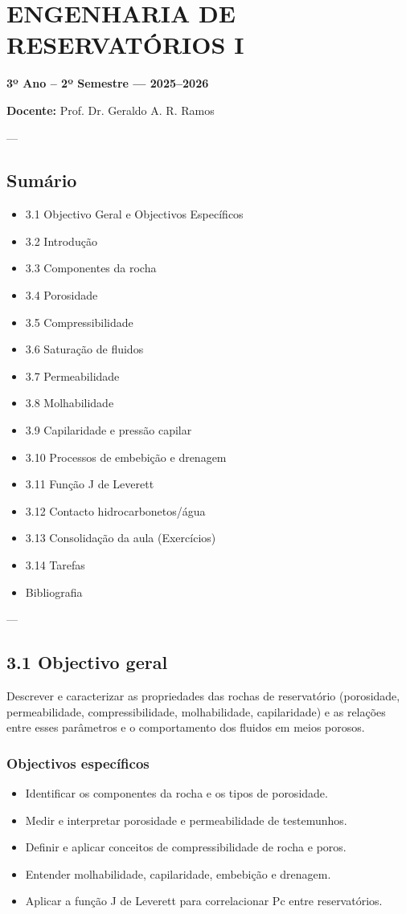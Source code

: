 \documentclass[11pt,a4paper]{article}
\begin{document}
\section{ENGENHARIA DE RESERVATÓRIOS I}
\textbf{3º Ano – 2º Semestre — 2025–2026}

\textbf{Docente:} Prof. Dr. Geraldo A. R. Ramos

---

\subsection{Sumário}
\begin{itemize}
\item 3.1 Objectivo Geral e Objectivos Específicos
\item 3.2 Introdução
\item 3.3 Componentes da rocha
\item 3.4 Porosidade
\item 3.5 Compressibilidade
\item 3.6 Saturação de fluidos
\item 3.7 Permeabilidade
\item 3.8 Molhabilidade
\item 3.9 Capilaridade e pressão capilar
\item 3.10 Processos de embebição e drenagem
\item 3.11 Função J de Leverett
\item 3.12 Contacto hidrocarbonetos/água
\item 3.13 Consolidação da aula (Exercícios)
\item 3.14 Tarefas
\item Bibliografia
\end{itemize}

---

\subsection{3.1 Objectivo geral}
Descrever e caracterizar as propriedades das rochas de reservatório (porosidade, permeabilidade, compressibilidade, molhabilidade, capilaridade) e as relações entre esses parâmetros e o comportamento dos fluidos em meios porosos.

\subsubsection{Objectivos específicos}
\begin{itemize}
\item Identificar os componentes da rocha e os tipos de porosidade.
\item Medir e interpretar porosidade e permeabilidade de testemunhos.
\item Definir e aplicar conceitos de compressibilidade de rocha e poros.
\item Entender molhabilidade, capilaridade, embebição e drenagem.
\item Aplicar a função J de Leverett para correlacionar Pc entre reservatórios.
\end{itemize}
\end{document}
